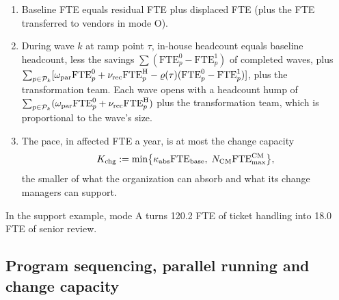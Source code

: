 \begin{lemma}\label{lem:ext-staffing}
\begin{enumerate}
\item[(a)] Baseline FTE equals residual FTE plus displaced FTE (plus the FTE transferred to vendors in mode O).
\item[(b)] During wave $k$ at ramp point $\tau$, in-house headcount equals baseline headcount, less the savings $\sum(\mathrm{FTE}^0_p-\mathrm{FTE}^1_p)$ of completed waves, plus $\sum_{p\in\mathcal P_k}[\omega_{\rm par}\mathrm{FTE}^0_p+\nu_{\rm rec}\mathrm{FTE}^{\mathrm H}_p-\varrho(\tau)(\mathrm{FTE}^0_p-\mathrm{FTE}^1_p)]$, plus the transformation team. Each wave opens with a headcount hump of $\sum_{p\in\mathcal P_k}(\omega_{\rm par}\mathrm{FTE}^0_p+\nu_{\rm rec}\mathrm{FTE}^{\mathrm H}_p)$ plus the transformation team, which is proportional to the wave's size.
\item[(c)] The pace, in affected FTE a year, is at most the change capacity
\[
K_{\rm chg}:=\min\bigl\{\kappa_{\rm abs}\mathrm{FTE}_{\rm base},\;N_{\rm CM}\mathrm{FTE}^{\rm CM}_{\max}\bigr\},
\]
the smaller of what the organization can absorb and what its change managers can support.
\end{enumerate}
\end{lemma}

In the support example, mode A turns 120.2 FTE of ticket handling into 18.0 FTE of senior review.

\subsection{Program sequencing, parallel running and change capacity}\label{sec:ext-program}

